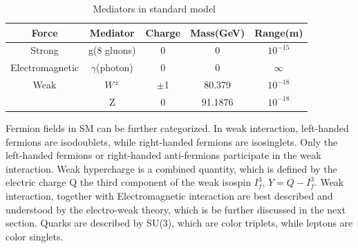 \begin{table}[htp]
\caption{Mediators in standard model~\cite{Griffiths:111880}}
\begin{center}
\begin{tabular}{|c|c|c|c|c|}
\hline
Force & Mediator & Charge & Mass(GeV) & Range(m)   \\\hline
Strong                & g(8 gluons)                  & 0 & 0 & $10^{-15}$   \\\hline
Electromagnetic & $\gamma$(photon)     & 0 & 0 &   $\infty$   \\\hline
Weak                  &  $W^{\pm}$                &$\pm$1 & 80.379 &$10^{-18}$\\
                           & Z                                &  0         & 91.1876 &  $10^{-18}$ \\\hline
\end{tabular}
\end{center}
\label{Mediator_infor}
\end{table}%


Fermion fields in SM can be further categorized. In weak interaction, left-handed fermions are isodoublets, while right-handed fermions are isosinglets. Only the left-handed fermions or right-handed anti-fermions participate in the weak interaction. Weak hypercharge is a combined quantity, which is defined by the electric charge Q the third component of the weak isospin $I^{3}_{f}$, $Y=Q-I^{3}_{f}$. Weak interaction, together with Electromagnetic interaction are best described and understood by the electro-weak theory, which is be further discussed in the next section.  Quarks are described by SU(3), which are color triplets, while leptons are color singlets.   

